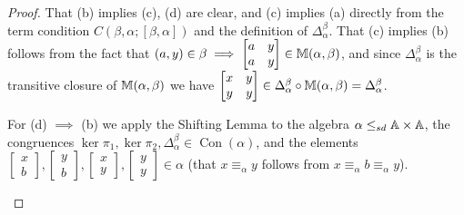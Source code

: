 \documentclass[letterpaper,11pt]{article}
\DeclareMathOperator{\Con}{Con}
\begin{document}
\begin{proof} That (b) implies (c), (d) are clear, and (c) implies (a) directly from the term condition $C(\beta,\alpha;[\beta,\alpha])$ and the definition of $\Delta_{\alpha}^{\beta}$. That (c) implies (b) follows from the fact that $(a,y) \in \beta \implies \begin{bmatrix} a & y\\ a & y\end{bmatrix} \in \mathbb{M}(\alpha,\beta)$, and since $\Delta_{\alpha}^{\beta}$ is the transitive closure of $\mathbb{M}(\alpha,\beta)$ we have $\begin{bmatrix} x & y\\ y & y\end{bmatrix} \in \Delta_{\alpha}^{\beta}\circ \mathbb{M}(\alpha,\beta) = \Delta_{\alpha}^{\beta}$.

For (d) $\implies$ (b) we apply the Shifting Lemma to the algebra $\alpha \le_{sd} \mathbb{A}\times \mathbb{A}$, the congruences $\ker \pi_1, \ker \pi_2, \Delta_{\alpha}^{\beta} \in \Con(\alpha)$, and the elements $\begin{bmatrix} x\\ b\end{bmatrix},\begin{bmatrix} y\\ b\end{bmatrix},\begin{bmatrix} x\\ y\end{bmatrix},\begin{bmatrix} y\\ y\end{bmatrix} \in \alpha$ (that $x \equiv_\alpha y$ follows from $x \equiv_\alpha b \equiv_\alpha y$).
\begin{center}
\end{center}


\end{proof}
\end{document}
